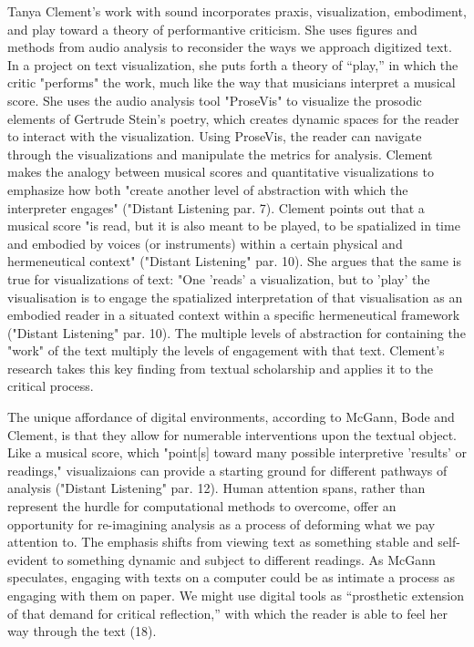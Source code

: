 \documentclass[11pt]{article}
\begin{document}
Tanya Clement's work with sound incorporates praxis, visualization,
embodiment, and play toward a theory of performantive criticism. She
uses figures and methods from audio analysis to reconsider the ways we
approach digitized text. In a project on text visualization, she puts
forth a theory of “play,” in which the critic "performs" the work,
much like the way that musicians interpret a musical score. She uses
the audio analysis tool "ProseVis" to visualize the prosodic elements
of Gertrude Stein's poetry, which creates dynamic spaces for the
reader to interact with the visualization. Using ProseVis, the reader
can navigate through the visualizations and manipulate the metrics for
analysis. Clement makes the analogy between musical scores and
quantitative visualizations to emphasize how both "create another
level of abstraction with which the interpreter engages" ("Distant
Listening par. 7). Clement points out that a musical score "is read,
but it is also meant to be played, to be spatialized in time and
embodied by voices (or instruments) within a certain physical and
hermeneutical context" ("Distant Listening" par. 10). She argues that
the same is true for visualizations of text: "One 'reads' a
visualization, but to 'play' the visualisation is to engage the
spatialized interpretation of that visualisation as an embodied reader
in a situated context within a specific hermeneutical framework
("Distant Listening" par. 10). The multiple levels of abstraction for
containing the "work" of the text multiply the levels of engagement
with that text. Clement's research takes this key finding from textual
scholarship and applies it to the critical process.

The unique affordance of digital environments, according to McGann,
Bode and Clement, is that they allow for numerable interventions upon
the textual object. Like a musical score, which "point[s] toward many
possible interpretive 'results' or readings," visualizaions can
provide a starting ground for different pathways of analysis ("Distant
Listening" par. 12). Human attention spans, rather than represent the
hurdle for computational methods to overcome, offer an opportunity for
re-imagining analysis as a process of deforming what we pay attention
to. The emphasis shifts from viewing text as something stable and
self-evident to something dynamic and subject to different
readings. As McGann speculates, engaging with texts on a computer
could be as intimate a process as engaging with them on paper. We
might use digital tools as “prosthetic extension of that demand for
critical reflection,” with which the reader is able to feel her way
through the text (18).
\end{document}
